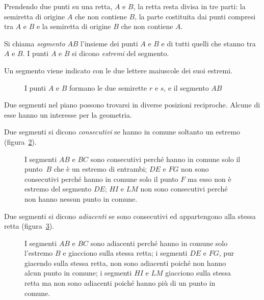 Prendendo due punti su una retta, $A$ e $B$, la retta resta divisa in tre parti: la semiretta di origine $A$ che non contiene $B$, la parte costituita dai punti compresi tra $A$ e $B$ e la semiretta di origine $B$ che non contiene $A$.

\begin{definizione}
Si chiama \emph{segmento} $AB$ l'insieme dei punti $A$ e $B$ e di tutti quelli che stanno tra $A$ e $B$.
I punti $A$ e $B$ si dicono \emph{estremi} del segmento.
\end{definizione}
Un segmento viene indicato con le due lettere maiuscole dei suoi estremi.
\begin{figure}[bth]
 \centering 
 \caption{I punti $A$ e $B$ formano le due semirette $r$ e $s$, e il segmento $AB$}\label{fig:1.13}
\end{figure}

Due segmenti nel piano possono trovarsi in diverse posizioni reciproche. Alcune di esse hanno un interesse per la geometria.
\begin{definizione}
Due segmenti si dicono \emph{consecutivi} se hanno in comune soltanto un estremo (figura~\ref{fig:1.14}).
\end{definizione}
\begin{figure}[bth]
 \centering 
 \caption{I segmenti $AB$ e $BC$ sono consecutivi perché hanno in comune solo il punto~$B$ che è un estremo di entrambi; $DE$ e $FG$ non sono consecutivi perché hanno in comune solo il punto $F$ ma esso non è estremo del segmento $DE$; $HI$ e $LM$ non sono consecutivi perché non hanno nessun punto in comune.}\label{fig:1.14}
\end{figure}

\begin{definizione}
Due segmenti si dicono \emph{adiacenti} se sono consecutivi ed appartengono alla stessa retta (figura~\ref{fig:1.15}).
\end{definizione}
\begin{figure}[tbh]
 \centering 
 \caption{I segmenti $AB$ e $BC$ sono adiacenti perché hanno in comune solo l'estremo $B$ e giacciono sulla stessa retta; i segmenti $DE$ e $FG$, pur giacendo sulla stessa retta, non sono adiacenti poiché non hanno alcun punto in comune; i segmenti $HI$ e $LM$ giacciono sulla stessa retta ma non sono adiacenti poiché hanno più di un punto in comune.}\label{fig:1.15}
\end{figure}

